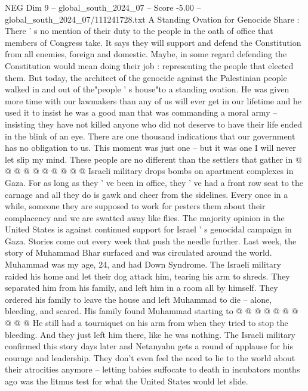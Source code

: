 \begin{textsample}{NEG Dim 9 – global\_south\_2024\_07 – Score -5.00 – global\_south\_2024\_07/111241728.txt}  \label{ex:f9_neg_334}
A Standing Ovation for Genocide Share : There ' s no mention of their duty to the people in the oath of office that members of Congress take.
It says they will support and defend the Constitution from all enemies, foreign and domestic.
Maybe, in some regard defending the Constitution would mean doing their job : representing the people that elected them.
But today, the architect of the genocide against the Palestinian people walked in and out of the"people ' s house"to a standing ovation.
He was given more time with our lawmakers than any of us will ever get in our lifetime and he used it to insist he was a good man that was commanding a moral army -- insisting they have not killed anyone who did not deserve to have their life ended in the blink of an eye.
There are one thousand indications that our government has no obligation to us.
This moment was just one -- but it was one I will never let slip my mind.
These people are no different than the settlers that gather in @ @ @ @ @ @ @ @ @ @ Israeli military drops bombs on apartment complexes in Gaza.
For as long as they ' ve been in office, they ' ve had a front row seat to the carnage and all they do is gawk and cheer from the sidelines.
Every once in a while, someone they are supposed to work for pesters them about their complacency and we are swatted away like flies.
The majority opinion in the United States is against continued support for Israel ' s genocidal campaign in Gaza.
Stories come out every week that push the needle further.
Last week, the story of Muhammad Bhar surfaced and was circulated around the world.
Muhammad was my age, 24, and had Down Syndrome.
The Israeli military raided his home and let their dog attack him, tearing his arm to shreds.
They separated him from his family, and left him in a room all by himself.
They ordered his family to leave the house and left Muhammad to die -- alone, bleeding, and scared.
His family found Muhammad starting to @ @ @ @ @ @ @ @ @ @ He still had a tourniquet on his arm from when they tried to stop the bleeding.
And they just left him there, like he was nothing.
The Israeli military confirmed this story days later and Netanyahu gets a round of applause for his courage and leadership.
They don't even feel the need to lie to the world about their atrocities anymore -- letting babies suffocate to death in incubators months ago was the litmus test for what the United States would let slide.

\end{textsample}
